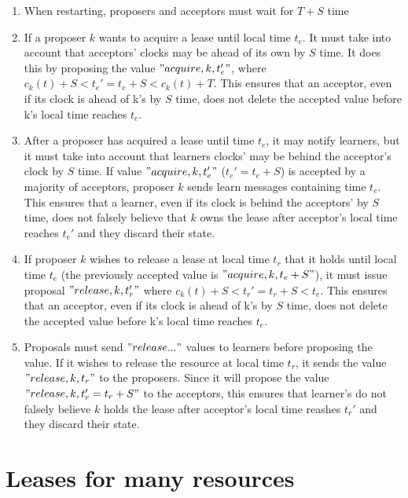 \documentclass[12pt]{article}
\begin{document}
\begin{enumerate}

\item When restarting, proposers and acceptors must wait for $T + S$ time

\item If a proposer $k$ wants to acquire a lease until local time $t_e$. It must take into account that acceptors' clocks may be ahead of its own by $S$ time. It does this by proposing the value $"acquire, k, t_e'"$, where $c_k(t) + S < t_e' = t_e + S < c_k(t) + T$. This ensures that an acceptor, even if its clock is ahead of k's by $S$ time, does not delete the accepted value before k's local time reaches $t_e$.
 
\item After a proposer has acquired a lease until time $t_e$, it may notify learners, but it must take into account that learners clocks' may be behind the acceptor's clock by $S$ time. If value $"acquire, k, t_e'"$ ($t_e' = t_e + S$) is accepted by a majority of acceptors, proposer $k$ sends learn messages containing time $t_e$. This ensures that a learner, even if its clock is behind the acceptors' by $S$ time, does not falsely believe that $k$ owns the lease after acceptor's local time reaches $t_e'$ and they discard their state.

\item If proposer $k$ wishes to release a lease at local time $t_r$ that it holds until local time $t_e$ (the previously accepted value is $"acquire, k, t_e + S"$), it must issue proposal $"release, k, t_r'"$ where $c_k(t) + S < t_r' = t_r + S < t_e$. This ensures that an acceptor, even if its clock is ahead of k's by $S$ time, does not delete the accepted value before k's local time reaches $t_e$.

\item Proposals must send $"release..."$ values to learners before proposing the value. If it wishes to release the resource at local time $t_r$, it sends the value $"release, k, t_r"$ to the proposers. Since it will propose the value $"release, k, t_r' = t_r + S"$ to the acceptors, this ensures that learner's do not falsely believe $k$ holds the lease after acceptor's local time reashes $t_r'$ and they discard their state.

\end{enumerate}

\section{ Leases for many resources }
\end{document}
